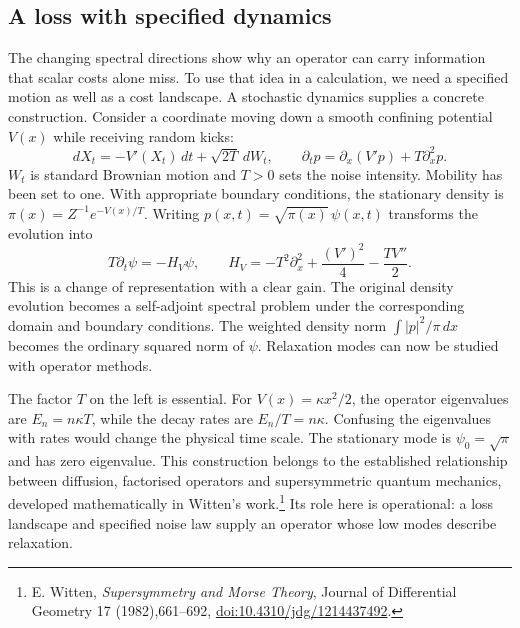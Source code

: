 \subsection{A loss with specified dynamics}
The changing spectral directions show why an operator can carry information that scalar costs alone miss. To use that idea in a calculation, we need a specified motion as well as a cost landscape. A stochastic dynamics supplies a concrete construction. Consider a coordinate moving down a smooth confining potential $V(x)$ while receiving random kicks:
\begin{equation}
 dX_t=-V'(X_t)\,dt+\sqrt{2T}\,dW_t,
 \qquad
 \partial_t p=\partial_x(V'p)+T\partial_x^2p.
 \label{eq:loss-diffusion}
\end{equation}
$W_t$ is standard Brownian motion and $T>0$ sets the noise intensity. Mobility has been set to one. With appropriate boundary conditions, the stationary density is $\pi(x)=Z^{-1}e^{-V(x)/T}$. Writing $p(x,t)=\sqrt{\pi(x)}\,\psi(x,t)$ transforms the evolution into
\begin{equation}
 T\partial_t\psi=-H_V\psi,\qquad
 H_V=-T^2\partial_x^2+\frac{(V')^2}{4}-\frac{T V''}{2}.
 \label{eq:loss-operator}
\end{equation}
This is a change of representation with a clear gain. The original density evolution becomes a self-adjoint spectral problem under the corresponding domain and boundary conditions. The weighted density norm $\int |p|^2/\pi\,dx$ becomes the ordinary squared norm of $\psi$. Relaxation modes can now be studied with operator methods.~\cite{Reference0e02fc}

The factor $T$ on the left is essential. For $V(x)=\kappa x^2/2$, the operator eigenvalues are $E_n=n\kappa T$, while the decay rates are $E_n/T=n\kappa$. Confusing the eigenvalues with rates would change the physical time scale. The stationary mode is $\psi_0=\sqrt{\pi}$ and has zero eigenvalue. This construction belongs to the established relationship between diffusion, factorised operators and supersymmetric quantum mechanics, developed mathematically in Witten's work.\footnote{E. Witten, \emph{Supersymmetry and Morse Theory}, Journal of Differential Geometry 17 (1982),661--692, \href{https://doi.org/10.4310/jdg/1214437492}{doi:10.4310/jdg/1214437492}.} Its role here is operational: a loss landscape and specified noise law supply an operator whose low modes describe relaxation.~\cite{Witten1982605ee8}

